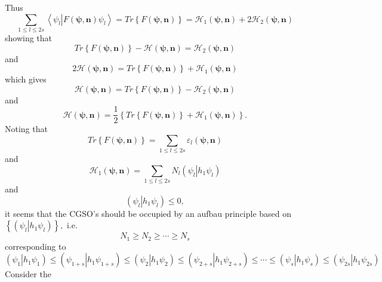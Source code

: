\documentclass[aps,preprint]{revtex4}%
\begin{document}
Thus
\begin{equation}%
{\textstyle\sum\limits_{1\leq l\leq2s}}
\left\langle \left.  \psi_{l}\right\vert F\left(  \mathbf{\psi,n}\right)
\psi_{l}\right\rangle =Tr\left\{  F\left(  \mathbf{\psi,n}\right)  \right\}
=\mathcal{H}_{1}\left(  \mathbf{\psi,n}\right)  +2\mathcal{H}_{2}\left(
\mathbf{\psi,n}\right)
\end{equation}
showing that
\begin{equation}
Tr\left\{  F\left(  \mathbf{\psi,n}\right)  \right\}  -\mathcal{H}\left(
\mathbf{\psi,n}\right)  =\mathcal{H}_{2}\left(  \mathbf{\psi,n}\right)
\end{equation}
and
\begin{equation}
2\mathcal{H}\left(  \mathbf{\psi,n}\right)  =Tr\left\{  F\left(
\mathbf{\psi,n}\right)  \right\}  +\mathcal{H}_{1}\left(  \mathbf{\psi
,n}\right)
\end{equation}
which gives
\begin{equation}
\mathcal{H}\left(  \mathbf{\psi,n}\right)  =Tr\left\{  F\left(  \mathbf{\psi
,n}\right)  \right\}  -\mathcal{H}_{2}\left(  \mathbf{\psi,n}\right)
\end{equation}
and
\begin{equation}
\mathcal{H}\left(  \mathbf{\psi,n}\right)  =\frac{1}{2}\left\{  Tr\left\{
F\left(  \mathbf{\psi,n}\right)  \right\}  +\mathcal{H}_{1}\left(
\mathbf{\psi,n}\right)  \right\}  .
\end{equation}
Noting that
\begin{equation}
Tr\left\{  F\left(  \mathbf{\psi,n}\right)  \right\}  =%
{\textstyle\sum\limits_{1\leq l\leq2s}}
\varepsilon_{l}\left(  \mathbf{\psi,n}\right)
\end{equation}
and
\begin{equation}
\mathcal{H}_{1}\left(  \mathbf{\psi,n}\right)  =%
{\textstyle\sum\limits_{1\leq l\leq2s}}
N_{l}\left(  \left.  \psi_{l}\right\vert h_{1}\psi_{l}\right)
\end{equation}
and
\begin{equation}
\left(  \left.  \psi_{l}\right\vert h_{1}\psi_{l}\right)  \leq0,
\end{equation}
it seems that the CGSO's should be occupied by an aufbau principle based on
$\left\{  \left(  \left.  \psi_{l}\right\vert h_{1}\psi_{l}\right)  \right\}
,$ i.e.
\begin{equation}
N_{1}\geq N_{2}\geq\cdots\geq N_{s}%
\end{equation}
corresponding to
\begin{equation}
\left(  \left.  \psi_{1}\right\vert h_{1}\psi_{1}\right)  \leq\left(  \left.
\psi_{1+s}\right\vert h_{1}\psi_{1+s}\right)  \leq\left(  \left.  \psi
_{2}\right\vert h_{1}\psi_{2}\right)  \leq\left(  \left.  \psi_{2+s}%
\right\vert h_{1}\psi_{2+s}\right)  \leq\cdots\leq\left(  \left.  \psi
_{s}\right\vert h_{1}\psi_{s}\right)  \leq\left(  \left.  \psi_{2s}\right\vert
h_{1}\psi_{2s}\right)
\end{equation}
Consider the
\end{document}
